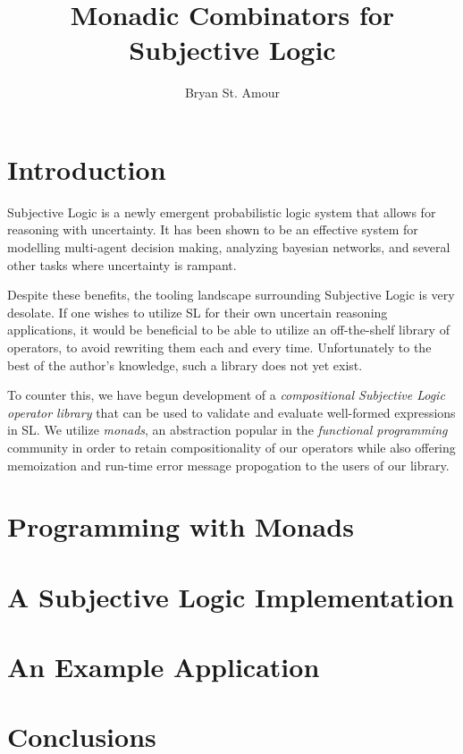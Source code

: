 \documentclass[a4paper]{article}
\title{Monadic Combinators for Subjective Logic}
\author{Bryan St. Amour}
\begin{document}
\maketitle

\section{Introduction}

Subjective Logic is a newly emergent probabilistic logic system that allows for
reasoning with uncertainty. It has been shown to be an effective system for modelling
multi-agent decision making, analyzing bayesian networks, and several other tasks
where uncertainty is rampant.

Despite these benefits, the tooling landscape surrounding Subjective Logic is very
desolate. If one wishes to utilize SL for their own uncertain reasoning applications, it
would be beneficial to be able to utilize an off-the-shelf library of operators, to avoid
rewriting them each and every time. Unfortunately to the best of the author's knowledge,
such a library does not yet exist.

To counter this, we have begun development of a \emph{compositional Subjective Logic
operator library} that can be used to validate and evaluate well-formed expressions in SL.
We utilize \emph{monads}, an abstraction popular in the \emph{functional programming}
community in order to retain compositionality of our operators while also offering
memoization and run-time error message propogation to the users of our library.

\section{Programming with Monads}



\section{A Subjective Logic Implementation}


\section{An Example Application}




\section{Conclusions}
\end{document}
